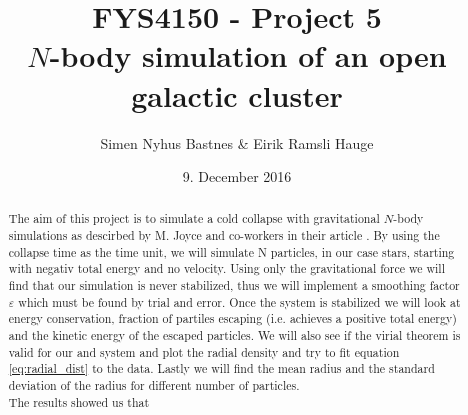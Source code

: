 \documentclass{article}
\title{FYS4150 - Project 5\\$N$-body simulation of an open galactic cluster}
\author{Simen Nyhus Bastnes \& Eirik Ramsli Hauge}
\date{9. December 2016}
\begin{document}
\maketitle
\begin{abstract}
The aim of this project is to simulate a cold collapse with gravitational $N$-body simulations as descirbed by M. Joyce and co-workers in their article \cite{Joyce}. By using the collapse time as the time unit, we will simulate N particles, in our case stars, starting with negativ total energy and no velocity. Using only the gravitational force we will find that our simulation is never stabilized, thus we will implement a smoothing factor $\varepsilon$ which must be found by trial and error. Once the system is stabilized we will look at energy conservation, fraction of partiles escaping (i.e. achieves a positive total energy) and the kinetic energy of the escaped particles. We will also see if the virial theorem is valid for our and system and plot the radial density and try to fit equation \eqref{eq:radial_dist} to the data. Lastly we will find the mean radius and the standard deviation of the radius for different number of particles. \\
The results showed us that 
\end{abstract}
\end{document}

